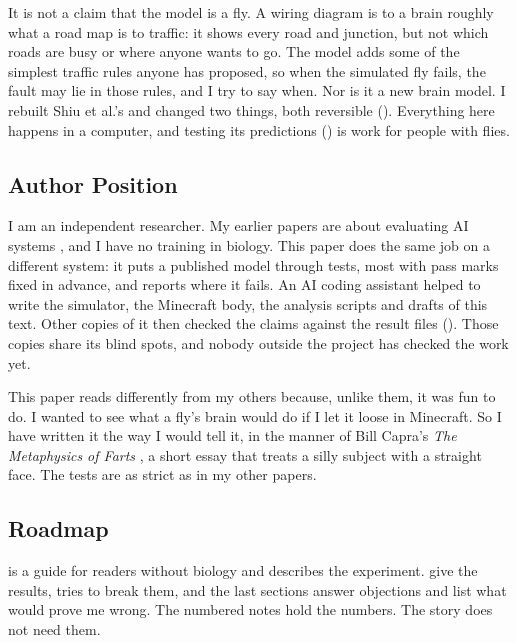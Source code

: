 It is not a claim that the model is a fly. A wiring diagram is to a brain roughly what a road map is to traffic: it shows every road and junction, but not which roads are busy or where anyone wants to go. The model adds some of the simplest traffic rules anyone has proposed, so when the simulated fly fails, the fault may lie in those rules, and I try to say when. Nor is it a new brain model. I rebuilt Shiu et al.'s and changed two things, both reversible (). Everything here happens in a computer, and testing its predictions () is work for people with flies.

\subsection{Author Position}

I am an independent researcher. My earlier papers are about evaluating AI systems \citep{lijo2026compound,lijo2026pifbench,lijo2026niche,lijo2026tsb,lijo2026spirits}, and I have no training in biology. This paper does the same job on a different system: it puts a published model through tests, most with pass marks fixed in advance, and reports where it fails. An AI coding assistant helped to write the simulator, the Minecraft body, the analysis scripts and drafts of this text. Other copies of it then checked the claims against the result files (). Those copies share its blind spots, and nobody outside the project has checked the work yet.

This paper reads differently from my others because, unlike them, it was fun to do. I wanted to see what a fly's brain would do if I let it loose in Minecraft. So I have written it the way I would tell it, in the manner of Bill Capra's \emph{The Metaphysics of Farts} \citep{capra2022metaphysics}, a short essay that treats a silly subject with a straight face. The tests are as strict as in my other papers.

\subsection{Roadmap}

 is a guide for readers without biology and  describes the experiment.  give the results,  tries to break them, and the last sections answer objections and list what would prove me wrong. The numbered notes hold the numbers. The story does not need them.

